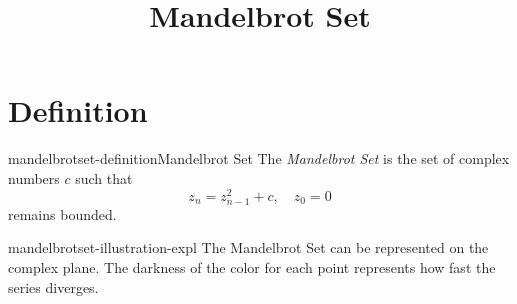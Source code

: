 \documentclass[preview]{standalone}
\begin{document}
\title{Mandelbrot Set}
\genpage

\section{Definition}

\begin{snippetdefinition}{mandelbrotset-definition}{Mandelbrot Set}
    The \textit{Mandelbrot Set} is the set of complex numbers \(c\) such that
    \[
        z_n = z_{n-1}^2 + c,\quad z_0=0
    \]
    remains bounded.
\end{snippetdefinition}

\begin{snippet}{mandelbrotset-illustration-expl}
The Mandelbrot Set can be represented on the complex plane.
The darkness of the color for each point
represents how fast the series diverges.
\end{snippet}

\end{document}
